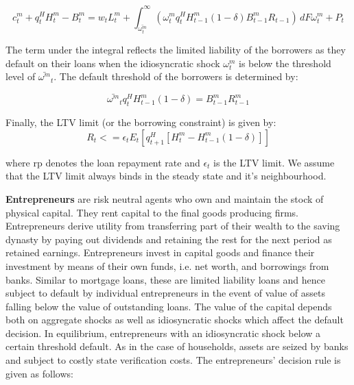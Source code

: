 \documentclass[12pt]{article}
\numberwithin{equation}{section}
\begin{document}
\begin{equation}
c^m_t+q^H_{t}H^m_{t} -B^m_{t}=w_{t}L^m_{t}+\int_{\bar{\omega^m_{t} }}^\infty  \left(\omega^m_{t} q^H_{t} H^m_{t-1} (1-\delta)B^m_{t-1}R_{t-1}\right) \, dF\omega^m_{t} + P_{t}
\end{equation}

The term under the integral reflects the limited liability of the borrowers as they default on their loans when the idiosyncratic shock $\omega^m_{t}$ is below the threshold level of $\bar{\omega^m}_t$. The default threshold of the borrowers is determined by: 

\begin{equation}
\bar{\omega^m}_t q^H_{t} H^m_{t-1}(1-\delta) = B^m_{t-1}R^m_{t-1}
\end{equation}


Finally, the LTV limit (or the borrowing constraint) is given by:
\begin{equation}
[B^m_{t}-(1-rp)B^m_{t-1}]R_{t} <=\epsilon_{t} E_t[q^H_{t+1} [H^m_t-H^m_{t-1}(1-\delta)]]
\end{equation}

where rp denotes the loan repayment rate and $\epsilon_{t}$ is the LTV limit. We assume that the LTV limit always binds in the steady state and it's neighbourhood.


\noindent
\textbf{Entrepreneurs } are risk neutral agents who own and maintain the stock of physical capital. They rent  capital to the final goods producing firms. Entrepreneurs derive utility from transferring part of their wealth to the saving dynasty by paying out dividends and retaining the rest for the next period as retained earnings. Entrepreneurs invest in capital goods and finance their investment by means of their own funds, i.e. net worth, and borrowings from banks. Similar to mortgage loans, these are limited liability loans and hence subject to default by individual entrepreneurs in the event of value of assets falling below the value of outstanding loans. The value of the capital depends both on aggregate shocks  as well as idiosyncratic shocks which affect the default decision. In equilibrium, entrepreneurs with an idiosyncratic shock below a certain threshold default.  As in the case of households, assets are seized by banks and subject to costly state verification costs. The entrepreneurs' decision rule is given as follows: 
\end{document}
